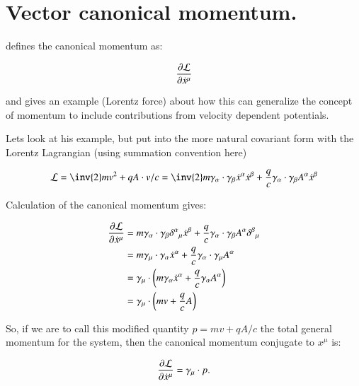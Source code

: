 %
\chapter{Vector canonical momentum.}

\cite{goldstein1951cm} defines the canonical momentum as:

\begin{equation*}
\frac{\partial {\mathcal{L}}}{\partial {\dot{x}^{\mu}}}
\end{equation*}

and gives an example (Lorentz force) about how this can generalize the
concept of momentum to include contributions from velocity dependent 
potentials.

Lets look at his example, but put into the more natural covariant form
with the Lorentz Lagrangian (using summation convention here)

\begin{equation*}
\LL = \inv{2} m v^2 + q A \cdot v /c = 
\inv{2} m \gamma_{\alpha} \cdot \gamma_{\beta} \xdot^{\alpha} \xdot^{\beta}
+ \frac{q}{c} \gamma_{\alpha} \cdot \gamma_{\beta} A^{\alpha} \xdot^{\beta}
\end{equation*}

Calculation of the canonical momentum gives:

\begin{align*}
\frac{\partial {\mathcal{L}}}{\partial {\dot{x}^{\mu}}} 
&=
m \gamma_{\alpha} \cdot \gamma_{\beta} {\delta^{\alpha}}_{\mu} \dot{x}^{\beta}
+ \frac{q}{c} \gamma_{\alpha} \cdot \gamma_{\beta} A^{\alpha} {\delta^{\beta}}_{\mu} \\
&=
m \gamma_{\mu} \cdot \gamma_{\alpha} \dot{x}^{\alpha}
+ \frac{q}{c} \gamma_{\alpha} \cdot \gamma_{\mu} A^{\alpha} \\
&=
\gamma_{\mu} \cdot \left( 
m \gamma_{\alpha} \dot{x}^{\alpha}
+ \frac{q}{c} \gamma_{\alpha} A^{\alpha}
\right) \\
&= \gamma_{\mu} \cdot \left( m v + \frac{q}{c} A \right) \\
\end{align*}

So, if we are to call this modified quantity $p = m v + q A / c$ the total general momentum for the system, then the canonical momentum conjugate to $x^{\mu}$ is:

\begin{equation*}
\frac{\partial {\mathcal{L}}}{\partial {\dot{x}^{\mu}}} = \gamma_{\mu} \cdot p.
\end{equation*}

